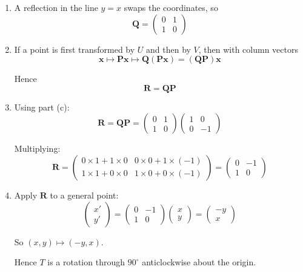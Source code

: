 \documentclass[leqno]{article}
\begin{document}
\begin{enumerate}[
  label=\textbf{\arabic*.},
  leftmargin=*,
  topsep=0pt,
  partopsep=0pt,
  parsep=0pt
]
\begin{djsSolution}
\begin{enumerate}[label=\textbf{(\alph*)}]
  \item A reflection in the line $y=x$ swaps the coordinates, so
  \[
  \mathbf{Q}=\begin{pmatrix}0&1\\1&0\end{pmatrix}
  \]

  \item If a point is first transformed by $U$ and then by $V$, then with column vectors
  \[
  \mathbf{x}\mapsto \mathbf{P}\mathbf{x}\mapsto \mathbf{Q}(\mathbf{P}\mathbf{x})=(\mathbf{Q}\mathbf{P})\mathbf{x}
  \]

  Hence
  \[
  \mathbf{R}=\mathbf{Q}\mathbf{P}
  \]

  \item Using part (c):
  \[
  \mathbf{R}=\mathbf{Q}\mathbf{P}=\begin{pmatrix}0&1\\1&0\end{pmatrix}\begin{pmatrix}1&0\\0&-1\end{pmatrix}
  \]

  Multiplying:
  \[
  \mathbf{R}=\begin{pmatrix}
  0\times 1+1\times 0 & 0\times 0+1\times (-1)\\
  1\times 1+0\times 0 & 1\times 0+0\times (-1)
  \end{pmatrix}
  =\begin{pmatrix}0&-1\\1&0\end{pmatrix}
  \]

  \item Apply $\mathbf{R}$ to a general point:
  \[
  \begin{pmatrix}x'\\y'\end{pmatrix}
  =
  \begin{pmatrix}0&-1\\1&0\end{pmatrix}
  \begin{pmatrix}x\\y\end{pmatrix}
  =
  \begin{pmatrix}-y\\x\end{pmatrix}
  \]

  So $(x,y)\mapsto (-y,x)$.

  Hence $T$ is a rotation through $90^\circ$ anticlockwise about the origin.
\end{enumerate}
\end{djsSolution}



\end{enumerate}
\end{document}
